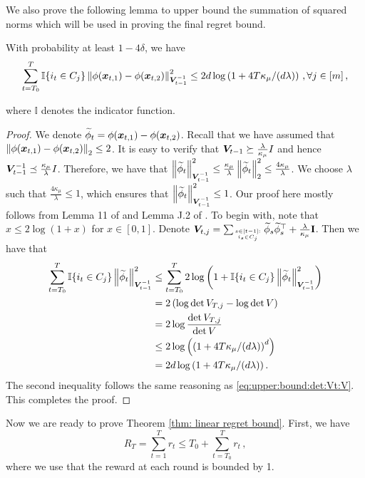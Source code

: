 We also prove the following lemma to upper bound the summation of squared norms which will be used in proving the final regret bound.
\begin{lemma}
With probability at least $1-4\delta$, we have
\label{lemma:concentration:square:std}
\[
\sum^T_{t=T_0}\mathbb{I}\{i_t\in C_j\}\left\| \phi(\boldsymbol{x}_{t,1}) - \phi(\boldsymbol{x}_{t,2}) \right\|_{\boldsymbol{V}_{t-1}^{-1}}^2 \leq 2 d\log \left( 1 + 4T \kappa_{\mu}/(d\lambda) \right)\,, \forall j\in[m]\,,
\]
\end{lemma}
where $\mathbb{I}$ denotes the indicator function.
\begin{proof}
We denote $\widetilde{\phi}_t = \phi(\boldsymbol{x}_{t,1}) - \phi(\boldsymbol{x}_{t,2})$.
Recall that we have assumed that $\left\| \phi(\boldsymbol{x}_{t,1}) - \phi(\boldsymbol{x}_{t,2}) \right\|_2 \leq 2$.
It is easy to verify that $\boldsymbol{V}_{t-1} \succeq \frac{\lambda}{\kappa_\mu} I$ and hence $\boldsymbol{V}_{t-1}^{-1} \preceq \frac{\kappa_\mu}{\lambda}I$.
Therefore, we have that $\left\| \widetilde{\phi}_t \right\|_{\boldsymbol{V}_{t-1}^{-1}}^2 \leq \frac{\kappa_\mu}{\lambda} \left\| \widetilde{\phi}_t \right\|_{2}^2 \leq \frac{4\kappa_\mu}{\lambda}$. We choose $\lambda$ such that $\frac{4\kappa_\mu}{\lambda} \leq 1$, which ensures that $\left\| \widetilde{\phi}_t \right\|_{\boldsymbol{V}_{t-1}^{-1}}^2 \leq 1$.
Our proof here mostly follows from Lemma 11 of \cite{abbasi2011improved} and Lemma J.2 of \cite{wang2024onlinea}. To begin with, note that $x\leq 2\log(1+x)$ for $x\in[0,1]$. Denote $\boldsymbol{V}_{t,j}=\sum_{s\in[t-1]:\atop i_s\in C_j} \widetilde{\phi}_s \widetilde{\phi}_s^\top + \frac{\lambda}{\kappa_\mu} \mathbf{I}$. Then we have that 
\begin{equation}
\begin{split}
\sum^T_{t=T_0}\mathbb{I}\{i_t\in C_j\}\left\| \widetilde{\phi}_t \right\|_{\boldsymbol{V}_{t-1}^{-1}}^2 &\leq \sum^T_{t=T_0} 2\log\left(1 + \mathbb{I}\{i_t\in C_j\}\left\| \widetilde{\phi}_t \right\|_{\boldsymbol{V}_{t-1}^{-1}}^2\right)\\
&= 2 \left( \log\det V_{T,j} - \log\det V \right)\\
&= 2 \log \frac{\det V_{T,j}}{\det V}\\
&\leq 2\log \left( \left( 1 + 4T \kappa_{\mu}/(d\lambda) \right)^{d} \right)\\
&= 2 d\log \left( 1 + 4T \kappa_{\mu}/(d\lambda) \right).
\end{split}
\end{equation}
The second inequality follows the same reasoning as \eqref{eq:upper:bound:det:Vt:V}.
This completes the proof.
\end{proof}

Now we are ready to prove Theorem \ref{thm: linear regret bound}.
First, we have
\begin{equation}
    R_T=\sum_{t=1}^T r_t\leq T_0 +\sum_{t=T_0}^T r_t\,,
\end{equation}
where we use that the reward at each round is bounded by 1.

